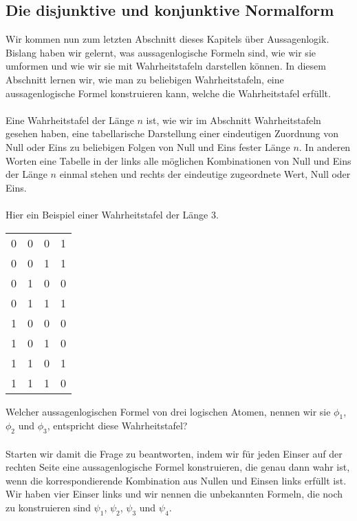 \documentclass[11pt,a4paper,leqno]{report}
\numberwithin{equation}{chapter}
\begin{document}
\subsection{Die disjunktive und konjunktive Normalform}
Wir kommen nun zum letzten Abschnitt dieses Kapitels über Aussagenlogik. Bislang haben wir gelernt, was aussagenlogische Formeln sind, wie wir sie umformen und wie wir sie mit Wahrheitstafeln darstellen können. In diesem Abschnitt lernen wir, wie man zu beliebigen Wahrheitstafeln, eine aussagenlogische Formel konstruieren kann, welche die Wahrheitstafel erfüllt.\\
\\
Eine Wahrheitstafel der Länge $n$ ist, wie wir im Abschnitt Wahrheitstafeln gesehen haben, eine tabellarische Darstellung einer eindeutigen Zuordnung von Null oder Eins zu beliebigen Folgen von Null und Eins fester Länge $n$. In anderen Worten eine Tabelle in der links alle möglichen Kombinationen von Null und Eins der Länge $n$ einmal stehen und rechts der eindeutige zugeordnete Wert, Null oder Eins.\\
\\
Hier ein Beispiel einer Wahrheitstafel der Länge 3.
\begin{center}
	\begin{tabular}{|c c c|c|}
		\hline
		0 & 0 & 0 & 1\\
		0 & 0 & 1 & 1\\
		0 & 1 & 0 & 0\\
		0 & 1 & 1 & 1\\
		1 & 0 & 0 & 0\\
		1 & 0 & 1 & 0\\
		1 & 1 & 0 & 1\\
		1 & 1 & 1 & 0\\
		\hline
	\end{tabular}  
\end{center}
Welcher aussagenlogischen Formel von drei logischen Atomen, nennen wir sie $\phi_1$, $\phi_2$ und $\phi_3$, entspricht diese Wahrheitstafel?\\
\\
Starten wir damit die Frage zu beantworten, indem wir für jeden Einser auf der rechten Seite eine aussagenlogische Formel konstruieren, die genau dann wahr ist, wenn die korrespondierende Kombination aus Nullen und Einsen links erfüllt ist.
Wir haben vier Einser links und wir nennen die unbekannten Formeln, die noch zu konstruieren sind $\psi_1$, $\psi_2$, $\psi_3$ und $\psi_4$.\\
\\
\end{document}
